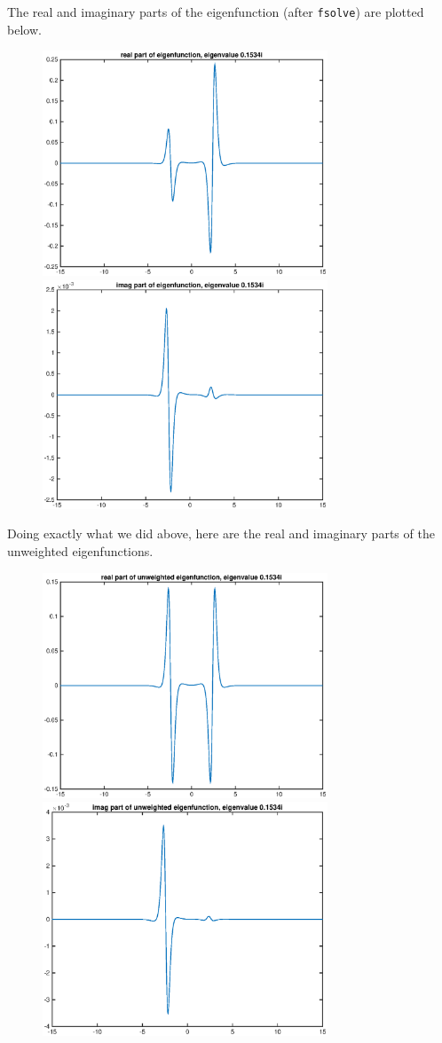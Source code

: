 \documentclass[12pt]{article}
\begin{document}
The real and imaginary parts of the eigenfunction (after \texttt{fsolve}) are plotted below.
\begin{figure}[H]
\includegraphics[width=8.5cm]{Sh1double2eigenfnreal}
\includegraphics[width=8.5cm]{Sh1double2eigenfnimag}
\end{figure}
Doing exactly what we did above, here are the real and imaginary parts of the unweighted eigenfunctions.
\begin{figure}[H]
\includegraphics[width=8.5cm]{Sh1double2eigenfnrealunweighted}
\includegraphics[width=8.5cm]{Sh1double2eigenfnimagunweighted}
\end{figure}
\end{document}
